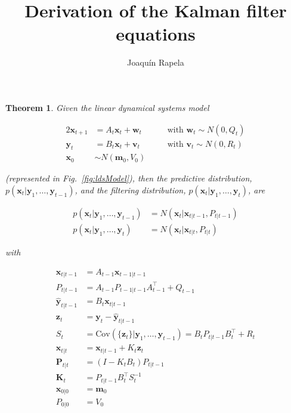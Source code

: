 \documentclass[12pt]{article}
\title{Derivation of the Kalman filter equations}
\author{Joaquín Rapela}
\newtheorem{theorem}{Theorem}
\begin{document}
\maketitle

\begin{theorem}

    Given the linear dynamical systems model

    \begin{alignat*}{2}
        \mathbf{x}_{t+1}&=A_t\mathbf{x}_t+\mathbf{w}_t&\quad&\text{with }\mathbf{w}_t\sim N(0,Q_t)\\
        \mathbf{y}_t&=B_t\mathbf{x}_t+\mathbf{v}_t&&\text{with }\mathbf{v}_t\sim N(0,R_t)\\
        \mathbf{x}_0&\sim N(\mathbf{m}_0,V_0)&&
    \end{alignat*}

    \noindent (represented in Fig.~\ref{fig:ldsModel}), then the predictive
    distribution, $p(\mathbf{x}_t|\mathbf{y}_1,\ldots,\mathbf{y}_{t-1})$, and
    the filtering distribution,
    $p(\mathbf{x}_t|\mathbf{y}_1,\ldots,\mathbf{y}_t)$, are

    \begin{align*}
        p(\mathbf{x}_t|\mathbf{y}_1,\ldots,\mathbf{y}_{t-1})&=N(\mathbf{x}_t|\mathbf{x}_{t|t-1},P_{t|t-1})\\
        p(\mathbf{x}_t|\mathbf{y}_1,\ldots,\mathbf{y}_t)&=N(\mathbf{x}_t|\mathbf{x}_{t|t},P_{t|t})
    \end{align*}

    \noindent with

    \begin{align*}
        \mathbf{x}_{t|t-1}&=A_{t-1}\mathbf{x}_{t-1|t-1}\\
        P_{t|t-1}&=A_{t-1}P_{t-1|t-1}A_{t-1}^\intercal+Q_{t-1}\\
        \hat{\mathbf{y}}_{t|t-1}&=B_t\mathbf{x}_{t|t-1}\\
        \mathbf{z}_t&=\mathbf{y}_t-\hat{\mathbf{y}}_{t|t-1}\\
        S_t&=\text{Cov}(\{\mathbf{z}_t\}|\mathbf{y}_1,\ldots,\mathbf{y}_{t-1})=B_tP_{t|t-1}B_t^\intercal+R_t\\
        \mathbf{x}_{t|t}&=\mathbf{x}_{t|t-1}+K_t\mathbf{z}_t\\
        \mathbf{P}_{t|t}&=(I-K_tB_t)P_{t|t-1}\\
        \mathbf{K}_t&=P_{t|t-1}B_t^\intercal S_t^{-1}\\
        \mathbf{x}_{0|0}&=\mathbf{m}_0\\
        P_{0|0}&=V_0
    \end{align*}
    \label{thm:kalmanFilterEqs}
\end{theorem}
\end{document}
